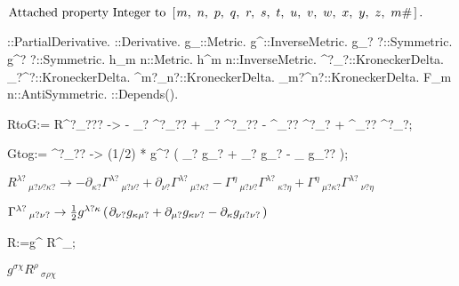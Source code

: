 \documentclass[12pt,a4paper,svgnames]{extarticle}
\newcommand\brwrap[3]{%
  \setbox0=\hbox{$#2$}
  \left#1\vbox to \the\ht0{\hbox to 0pt{}}\right.\kern-.2em
  \begingroup #2\endgroup\kern-.15em
  \left.\vbox to \the\ht0{\hbox to 0pt{}}\right#3
}
\begin{document}
\begin{adjustwidth}{1em}{0cm}${}\text{Attached property Integer to~}\brwrap{[}{m,~\discretionary{}{}{} n,~\discretionary{}{}{} p,~\discretionary{}{}{} q,~\discretionary{}{}{} r,~\discretionary{}{}{} s,~\discretionary{}{}{} t,~\discretionary{}{}{} u,~\discretionary{}{}{} v,~\discretionary{}{}{} w,~\discretionary{}{}{} x,~\discretionary{}{}{} y,~\discretionary{}{}{} z,~\discretionary{}{}{} m\#}{]}.$\end{adjustwidth}
\begin{python}
\partial{#}::PartialDerivative.
\nabla{#}::Derivative.
g_{\mu\nu}::Metric.
g^{\mu\nu}::InverseMetric.
g_{\mu? \nu?}::Symmetric.
g^{\mu? \nu?}::Symmetric.
h_{m n}::Metric.
h^{m n}::InverseMetric.
\delta^{\mu?}_{\nu?}::KroneckerDelta.
\delta_{\mu?}^{\nu?}::KroneckerDelta.
\delta^{m?}_{n?}::KroneckerDelta.
\delta_{m?}^{n?}::KroneckerDelta.
F_{m n}::AntiSymmetric.
\pi::Depends(\nabla{#}).
\end{python}
\begin{python}
RtoG:= R^{\lambda?}_{\mu?\nu?\kappa?} -> 
 - \partial_{\kappa?}{ \Gamma^{\lambda?}_{\mu?\nu?} }
 + \partial_{\nu?}{ \Gamma^{\lambda?}_{\mu?\kappa?} }
 - \Gamma^{\eta}_{\mu?\nu?} \Gamma^{\lambda?}_{\kappa?\eta}
 + \Gamma^{\eta}_{\mu?\kappa?} \Gamma^{\lambda?}_{\nu?\eta};

Gtog:= \Gamma^{\lambda?}_{\mu?\nu?} ->
  (1/2) * g^{\lambda?\kappa} ( 
        \partial_{\nu?}{ g_{\kappa\mu?} } + \partial_{\mu?}{ g_{\kappa\nu?} } - \partial_{\kappa}{ g_{\mu?\nu?} } );
\end{python}
\begin{adjustwidth}{1em}{0cm}${}R^{\lambda?}\,_{\mu? \nu? \kappa?} \rightarrow -\partial_{\kappa?}{\Gamma^{\lambda?}\,_{\mu? \nu?}}+\partial_{\nu?}{\Gamma^{\lambda?}\,_{\mu? \kappa?}}-\Gamma^{\eta}\,_{\mu? \nu?} \Gamma^{\lambda?}\,_{\kappa? \eta}+\Gamma^{\eta}\,_{\mu? \kappa?} \Gamma^{\lambda?}\,_{\nu? \eta}$\end{adjustwidth}
\begin{adjustwidth}{1em}{0cm}${}\Gamma^{\lambda?}\,_{\mu? \nu?} \rightarrow \frac{1}{2}g^{\lambda? \kappa} \brwrap{(}{\partial_{\nu?}{g_{\kappa \mu?}}+\partial_{\mu?}{g_{\kappa \nu?}}-\partial_{\kappa}{g_{\mu? \nu?}}}{)}$\end{adjustwidth}
\begin{python}
R:=g^{\sigma \chi} R^{\rho}_{\sigma \rho \chi};
\end{python}
\begin{adjustwidth}{1em}{0cm}${}g^{\sigma \chi} R^{\rho}\,_{\sigma \rho \chi}$\end{adjustwidth}
\end{document}
